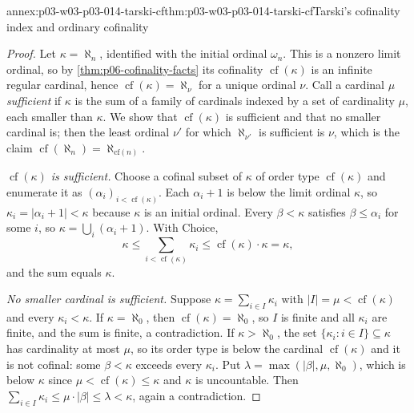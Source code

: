 \begin{annexitem}{annex:p03-w03-p03-014-tarski-cf}{thm:p03-w03-p03-014-tarski-cf}{Tarski's cofinality index and ordinary cofinality}
\begin{proof}
Let \(\kappa=\aleph_n\), identified with the initial ordinal
\(\omega_n\). This is a nonzero limit ordinal, so by
\cref{thm:p06-cofinality-facts} its cofinality
\(\operatorname{cf}(\kappa)\) is an infinite regular cardinal, hence
\(\operatorname{cf}(\kappa)=\aleph_\nu\) for a unique ordinal \(\nu\).
Call a cardinal \(\mu\) \emph{sufficient} if \(\kappa\) is the sum of a
family of cardinals indexed by a set of cardinality \(\mu\), each
smaller than \(\kappa\). We show that \(\operatorname{cf}(\kappa)\) is
sufficient and that no smaller cardinal is; then the least ordinal
\(\nu'\) for which \(\aleph_{\nu'}\) is sufficient is \(\nu\), which is
the claim \(\operatorname{cf}(\aleph_n)=\aleph_{\mathrm{cf}(n)}\).

\emph{\(\operatorname{cf}(\kappa)\) is sufficient.} Choose a cofinal
subset of \(\kappa\) of order type \(\operatorname{cf}(\kappa)\) and
enumerate it as \((\alpha_i)_{i<\operatorname{cf}(\kappa)}\). Each
\(\alpha_i+1\) is below the limit ordinal \(\kappa\), so
\(\kappa_i=|\alpha_i+1|<\kappa\) because \(\kappa\) is an initial
ordinal. Every \(\beta<\kappa\) satisfies \(\beta\leq\alpha_i\) for some
\(i\), so \(\kappa=\bigcup_i(\alpha_i+1)\). With Choice,
\[
 \kappa\leq\sum_{i<\operatorname{cf}(\kappa)}\kappa_i
 \leq\operatorname{cf}(\kappa)\cdot\kappa=\kappa,
\]
and the sum equals \(\kappa\).

\emph{No smaller cardinal is sufficient.} Suppose
\(\kappa=\sum_{i\in I}\kappa_i\) with \(|I|=\mu<\operatorname{cf}(\kappa)\)
and every \(\kappa_i<\kappa\). If \(\kappa=\aleph_0\), then
\(\operatorname{cf}(\kappa)=\aleph_0\), so \(I\) is finite and all
\(\kappa_i\) are finite, and the sum is finite, a contradiction. If
\(\kappa>\aleph_0\), the set \(\{\kappa_i:i\in I\}\subseteq\kappa\) has
cardinality at most \(\mu\), so its order type is below the cardinal
\(\operatorname{cf}(\kappa)\) and it is not cofinal: some \(\beta<\kappa\)
exceeds every \(\kappa_i\). Put \(\lambda=\max(|\beta|,\mu,\aleph_0)\),
which is below \(\kappa\) since \(\mu<\operatorname{cf}(\kappa)\leq\kappa\)
and \(\kappa\) is uncountable. Then
\(\sum_{i\in I}\kappa_i\leq\mu\cdot|\beta|\leq\lambda<\kappa\), again
a contradiction.
\end{proof}
\end{annexitem}

